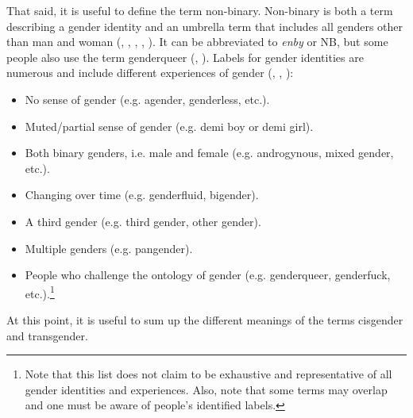 That said, it is useful to define the term non-binary. Non-binary is both a term describing a gender identity and an umbrella term that includes all genders other than man and woman (\cite[96]{richards2016non}, \cite[150]{barker2018rewriting}, \cite*[28]{barker2018psychology}, \cite{lester2018trans}, \cite[61--62]{barker2019life}). It can be abbreviated to \textit{enby} or NB, but some people also use the term genderqueer (\cite[96]{richards2016non}, \cite[61--62]{barker2019life}). Labels for gender identities are numerous and include different experiences of gender (\cite[96]{richards2016non}, \cite[150]{barker2018rewriting}, \cite[61]{barker2019life}): 
\begin{itemize}
\setlength\itemsep{-0.5em}
    \item No sense of gender (e.g. agender, genderless, etc.).
    \item Muted/partial sense of gender (e.g. demi boy or demi girl).
    \item Both binary genders, i.e. male and female (e.g. androgynous, mixed gender, etc.).
    \item Changing over time (e.g. genderfluid, bigender).
    \item A third gender (e.g. third gender, other gender).
    \item Multiple genders (e.g. pangender).
    \item People who challenge the ontology of gender (e.g. genderqueer, genderfuck, etc.).\footnote{Note that this list does not claim to be exhaustive and representative of all gender identities and experiences. Also, note that some terms may overlap and one must be aware of people's identified labels.}
\end{itemize}
At this point, it is useful to sum up the different meanings of the terms cisgender and transgender. 
